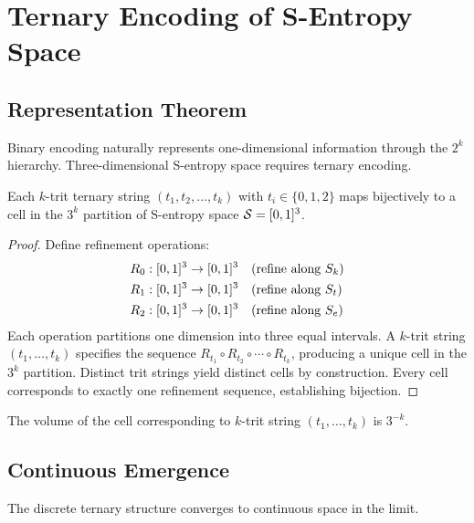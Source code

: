 \section{Ternary Encoding of S-Entropy Space}
\label{sec:ternary}

\subsection{Representation Theorem}

Binary encoding naturally represents one-dimensional information through the $2^k$ hierarchy. Three-dimensional S-entropy space requires ternary encoding.

\begin{theorem}
\label{thm:trit_coordinate}
Each $k$-trit ternary string $(t_1,t_2,\ldots,t_k)$ with $t_i \in \{0,1,2\}$ maps bijectively to a cell in the $3^k$ partition of S-entropy space $\mathcal{S} = [0,1]^3$.
\end{theorem}

\begin{proof}
Define refinement operations:
\begin{align}
R_0: [0,1]^3 &\to [0,1]^3 \quad \text{(refine along } S_k \text{)} \\
R_1: [0,1]^3 &\to [0,1]^3 \quad \text{(refine along } S_t \text{)} \\
R_2: [0,1]^3 &\to [0,1]^3 \quad \text{(refine along } S_e \text{)}
\end{align}
Each operation partitions one dimension into three equal intervals. A $k$-trit string $(t_1,\ldots,t_k)$ specifies the sequence $R_{t_1} \circ R_{t_2} \circ \cdots \circ R_{t_k}$, producing a unique cell in the $3^k$ partition. Distinct trit strings yield distinct cells by construction. Every cell corresponds to exactly one refinement sequence, establishing bijection.
\end{proof}

\begin{corollary}
The volume of the cell corresponding to $k$-trit string $(t_1,\ldots,t_k)$ is $3^{-k}$.
\end{corollary}

\subsection{Continuous Emergence}

The discrete ternary structure converges to continuous space in the limit.

